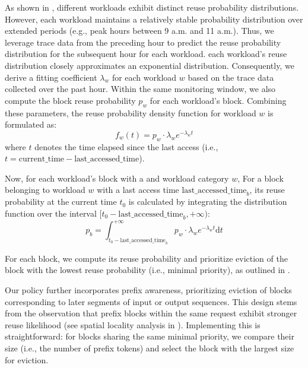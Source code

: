 \iffalse
As shown in {},
different workloads exhibit distinct reuse probability distributions.
However, each workload maintains a relatively stable probability distribution
over extended periods (e.g., peak hours between 9 a.m. and 11 a.m.).
Thus, we leverage trace data from the preceding hour to predict the
reuse probability distribution for the subsequent hour for each workload.
each workload’s reuse distribution closely approximates an exponential distribution.
Consequently, we derive a fitting coefficient $\lambda_w$
for each workload $w$ based on the trace data collected over the past hour.
Within the same monitoring window, we also compute the block reuse probability $p_w$
for each workload’s {\kvcache} block. Combining these parameters,
the reuse probability density function for workload $w$ is formulated as:
$$
f_w(t) = p_w \cdot \lambda_w e^{-\lambda_w t}
$$
where $t$ denotes the time elapsed since the last access
(i.e., $t = \text{current\_time} - \text{last\_accessed\_time}$).

Now, for each workload's {\kvcache} block with a and workload category $w$,
For a {\kvcache} block belonging to workload $w$ with a last access time $\text{last\_accessed\_time}_b$,
its reuse probability at the current time $t_0$
is calculated by integrating the distribution function over the interval
$[t_0 - \text{last\_accessed\_time}_b, +\infty)$:
$$
p_b = \int_{t_0 - \text{last\_accessed\_time}_b}^{+\infty} p_w \cdot \lambda_w e^{-\lambda_w t} \mathrm{d}t
$$

For each {\kvcache} block, we compute its reuse probability and prioritize eviction
of the block with the lowest reuse probability (i.e., minimal priority),
as outlined in {}.

Our policy further incorporates prefix awareness, prioritizing eviction of blocks
corresponding to later segments of input or output sequences. This design stems from
the observation that prefix blocks within the same request exhibit stronger
reuse likelihood (see spatial locality analysis in \textsection{\ref{sec:motiv-temporal-spatial}}).
Implementing this is straightforward: for blocks sharing the same minimal priority,
we compare their size (i.e., the number of prefix tokens) and select the block with
the largest size for eviction.

